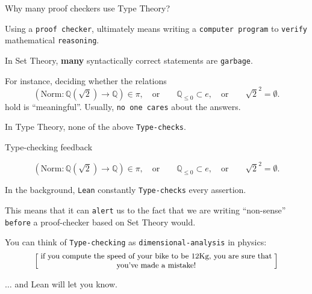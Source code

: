\documentclass{beamer}
\begin{document}
\begin{frame}[fragile]{Why many proof checkers use Type Theory?}

Using a {\color{violet}\verb`proof checker`}, ultimately means writing a {\color{violet}\verb`computer program`} to {\color{violet}\verb`verify`} mathematical {\color{violet}\verb`reasoning`}.

In Set Theory, {\textbf{many}} syntactically correct statements are {\color{violet}\verb`garbage`}.

For instance, deciding whether the relations
$$
  \left(
    {\textrm{Norm}} \colon \mathbb{Q}\left( \sqrt{2} \right) \to \mathbb{Q}
  \right) \in \pi,
  \quad {\textrm{or}} \qquad
  \mathbb{Q}_{\le 0} \subset e,
  \quad {\textrm{or}} \qquad
  \sqrt{2} ^ 2 = \emptyset.
$$
hold is ``meaningful''.
Usually, {\color{violet}\verb`no one cares`} about the answers.

In Type Theory, none of the above {\color{violet}\verb`Type-checks`}.
\end{frame}

\begin{frame}[fragile]{Type-checking feedback}

$$
  \left(
    {\textrm{Norm}} \colon \mathbb{Q}\left( \sqrt{2} \right) \to \mathbb{Q}
  \right) \in \pi,
  \quad {\textrm{or}} \qquad
  \mathbb{Q}_{\le 0} \subset e,
  \quad {\textrm{or}} \qquad
  \sqrt{2} ^ 2 = \emptyset.
$$

In the background, {\color{violet}\verb`Lean`} constantly {\color{violet}\verb`Type-checks`} every assertion.

This means that it can {\color{violet}\verb`alert`} us to the fact that we are writing ``non-sense'' {\color{violet}\verb`before`} a proof-checker based on Set Theory would.

You can think of {\color{violet}\verb`Type-checking`} as {\color{violet}\verb`dimensional-analysis`} in physics:
\[
  \left[ \;
  \parbox{0.8\textwidth}{\centering\small
  if you compute the speed of your bike to be $12$Kg, you are sure that you've made a mistake!
  }
  \; \right]
\]

$\ldots$ and Lean will let you know.
\end{frame}
\end{document}
